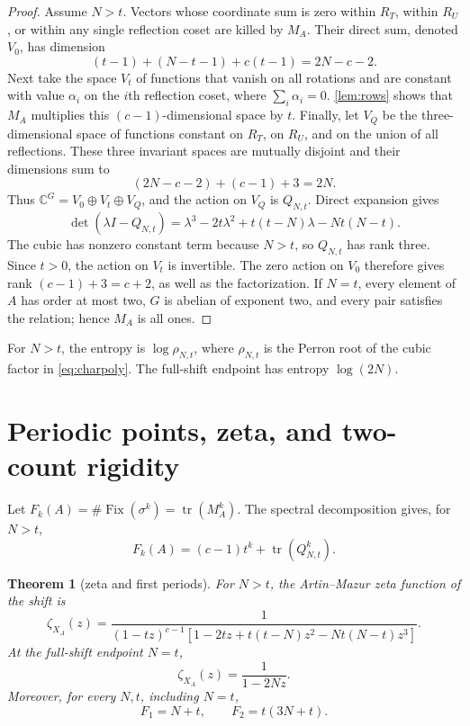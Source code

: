 \documentclass[11pt,a4paper]{amsart}
\newtheorem{theorem}{Theorem}[section]
\theoremstyle{definition}
\theoremstyle{remark}
\newcommand{\Fix}{\operatorname{Fix}}
\newcommand{\tr}{\operatorname{tr}}
\begin{document}
\begin{proof}
Assume $N>t$.  Vectors whose coordinate sum is zero within $R_T$, within
$R_U$, or within any single reflection coset are killed by $M_A$.  Their
direct sum, denoted $V_0$, has dimension
\[
 (t-1)+(N-t-1)+c(t-1)=2N-c-2.
\]
Next take the space $V_t$ of functions that vanish on all rotations and are
constant with value $\alpha_i$ on the $i$th reflection coset, where
$\sum_i\alpha_i=0$.  \cref{lem:rows} shows that $M_A$ multiplies this
$(c-1)$-dimensional space by $t$.  Finally, let $V_Q$ be the
three-dimensional space of functions constant on $R_T$, on $R_U$, and on
the union of all reflections.  These three invariant spaces are mutually
disjoint and their dimensions sum to
\[
 (2N-c-2)+(c-1)+3=2N.
\]
Thus $\mathbb C^G=V_0\oplus V_t\oplus V_Q$, and the action on $V_Q$ is
$Q_{N,t}$.  Direct expansion gives
\[
 \det(\lambda I-Q_{N,t})
 =\lambda^3-2t\lambda^2+t(t-N)\lambda-Nt(N-t).
\]
The cubic has nonzero constant term because $N>t$, so $Q_{N,t}$ has rank
three.  Since $t>0$, the action on $V_t$ is invertible.  The zero action on
$V_0$ therefore gives rank $(c-1)+3=c+2$, as well as the factorization.  If
$N=t$, every element of $A$ has
order at most two, $G$ is abelian of exponent two, and every pair satisfies
the relation; hence $M_A$ is all ones.
\end{proof}

For $N>t$, the entropy is $\log\rho_{N,t}$, where $\rho_{N,t}$ is the Perron
root of the cubic factor in \eqref{eq:charpoly}.  The full-shift endpoint has
entropy $\log(2N)$.

\section{Periodic points, zeta, and two-count rigidity}

Let $F_k(A)=\#\Fix(\sigma^k)=\tr(M_A^k)$.  The spectral decomposition gives,
for $N>t$,
\begin{equation}\label{eq:allfix}
 F_k(A)=(c-1)t^k+\tr(Q_{N,t}^k).
\end{equation}

\begin{theorem}[zeta and first periods]\label{thm:zeta}
For $N>t$, the Artin--Mazur zeta function of the shift is
\begin{equation}\label{eq:zeta}
 \zeta_{X_A}(z)
 =\frac{1}{(1-tz)^{c-1}
 \left[1-2tz+t(t-N)z^2-Nt(N-t)z^3\right]}.
\end{equation}
At the full-shift endpoint $N=t$,
\begin{equation}\label{eq:zeta-endpoint}
 \zeta_{X_A}(z)=\frac1{1-2Nz}.
\end{equation}
Moreover, for every $N,t$, including $N=t$,
\begin{equation}\label{eq:firsttwo}
 F_1=N+t,\qquad F_2=t(3N+t).
\end{equation}
\end{theorem}
\end{document}
